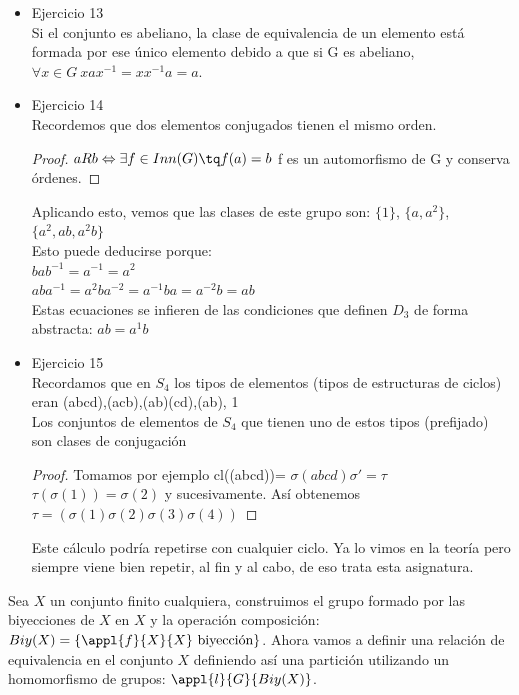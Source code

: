 \documentclass{apuntes}
\begin{document}
\begin{itemize}
 \item Ejercicio 13\\
 Si el conjunto es abeliano, la clase de equivalencia de un elemento está formada por ese único elemento debido a que si G es abeliano,
 $\forall x \in G \ xax^{-1}=xx^{-1}a=a$.\
 
 \item Ejercicio 14\\
 Recordemos que dos elementos conjugados tienen el mismo orden.
 \begin{proof}
  $aRb \Leftrightarrow \exists f \in Inn(G) \tq f(a)=b$  f es un automorfismo de G y conserva órdenes.
 \end{proof}
 Aplicando esto, vemos que las clases de este grupo son: $\{1\}$, $\{a, a^{2}\}$, $\{a^{2}, ab, a^{2}b\}$\\
 Esto puede deducirse porque:\\
 $bab^{-1}=a^{-1}=a^{2}$\\
 $aba^{-1}=a^{2}ba^{-2}=a^{-1}ba=a^{-2}b=ab$\\
 Estas ecuaciones se infieren de las condiciones que definen $D_3$ de forma abstracta: $ab=a^{1}b$\\
 
 \item Ejercicio 15\\
 Recordamos que en $S_4$  los tipos de elementos (tipos de estructuras de ciclos) eran (abcd),(acb),(ab)(cd),(ab), 1\\
 Los conjuntos de elementos de $S_4$  que tienen uno de estos tipos (prefijado) son clases de conjugación\\
 \begin{proof}
  Tomamos por ejemplo cl((abcd))= $\sigma (abcd) \sigma'= \tau$\\
  $\tau(\sigma(1))=\sigma(2)$  y sucesivamente. Así obtenemos
  $\tau = (\sigma(1)\sigma(2)\sigma(3)\sigma(4))$
 \end{proof}

 Este cálculo podría repetirse con cualquier ciclo. Ya lo vimos en la teoría pero siempre viene bien repetir, al fin y al cabo, de eso trata esta asignatura.
\end{itemize}

Sea $X$ un conjunto finito cualquiera, construimos el grupo formado por las biyecciones de $X$ en $X$ y la operación composición: $Biy(X) = \{\appl{f}{X}{X}\ \text{biyección}\}$. Ahora vamos a definir una relación de equivalencia en el conjunto $X$ definiendo así una partición utilizando un homomorfismo de grupos: $\appl{l}{G}{Biy(X)}$.\\
\end{document}
